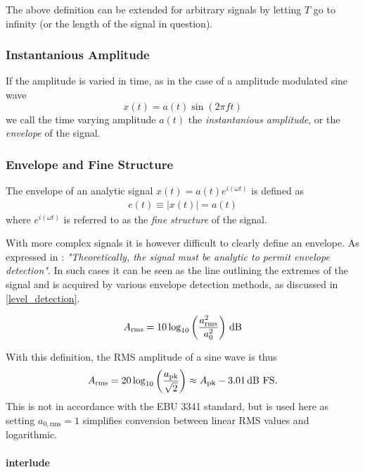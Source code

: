 \documentclass[../main2.tex]{subfiles}
\begin{document}
The above definition can be extended for arbitrary signals by letting $T$ go to infinity (or the length of the signal in question).

\subsubsection{Instantanious Amplitude}
If the amplitude is varied in time, as in the case of a amplitude modulated sine wave
\begin{equation}
x(t) = a(t) \sin (2 \pi f t)
\end{equation}
we call the time varying amplitude $a(t)$ the \emph{instantanious amplitude}, or the \emph{envelope} of the signal.

\subsubsection{Envelope and Fine Structure}
The envelope of an analytic signal $x(t) = a(t)e^{i(\omega t)}$ is defined as \cite{bedrosian1962analytic}
\begin{align}
e(t) \equiv |x(t)| = a(t)
\end{align}
where $e^{i(\omega t)}$ is referred to as the \emph{fine structure} of the signal.

With more complex signals it is however difficult to clearly define an envelope. As expressed in \cite{bedrosian1962analytic}: \emph{"Theoretically, the signal must be analytic to permit envelope detection"}. In such cases it can be seen as the line outlining the extremes of the signal and is acquired by various envelope detection methods, as discussed in \ref{level_detection}.




\begin{equation}
A_\text{rms} =
10 \log_{10} \left( \frac{a_\text{rms}^2}{a_0^2} \right) \mskip3mu\text{dB}
\end{equation}



With this definition, the RMS amplitude of a sine wave is thus
\begin{equation}
A_\text{rms} = 20\log_{10} \left( \frac{a_\text{pk}}{\sqrt 2} \right) \approx A_\text{pk} - 3.01 \mskip3mu\text{dB FS}.
\end{equation}
This is not in accordance with the EBU 3341 standard, but is used here as setting $a_{0, \text{rms}} = 1$ simplifies conversion between linear RMS values and logarithmic.


\paragraph{interlude}
\end{document}
